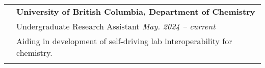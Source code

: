 \documentclass[letterpaper, 11pt]{article}
\begin{document}
\begin{longtable}{p{1.3in}p{4.8in}}
	\nohyphens{\color{Blue}{Research Experience}}
	 & \textbf{University of British Columbia, Department of Chemistry}                                                                                                                                                                                                                                                                                                                          \\
	 & Undergraduate Research Assistant \hfill \textit{May. 2024 --  current}                                                                                                                                                                                                                                                                                                                    \\
	 & Aiding in development of self-driving lab interoperability for chemistry.                                                                                                                                                                                                                                                                                                                                 \\
	 &                                                                                                                                                                                                                                                                                                                                                                                           \\


\end{longtable}
\end{document}
